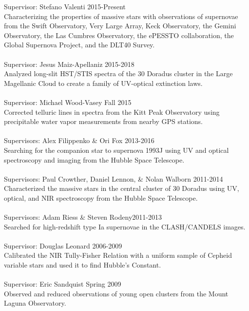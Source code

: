 \documentclass[10pt]{cv}
\begin{document}
\begin{llist}
\vspace{-0.1in}   
Supervisor: Stefano Valenti \hfill 2015-Present\\
Characterizing the properties of massive stars with observations of supernovae from the Swift Observatory, Very Large Array, Keck Observatory, the Gemini Observatory, the Las Cumbres Observatory, the ePESSTO collaboration, the Global Supernova Project, and the DLT40 Survey.\\
\\
Supervisor: Jesus Maiz-Apellaniz \hfill 2015-2018\\
Analyzed long-slit HST/STIS spectra of the 30 Doradus cluster in 
the Large Magellanic Cloud to create a family of UV-optical extinction laws. \\
\\
Supervisor: Michael Wood-Vasey \hfill Fall 2015\\
Corrected telluric lines in spectra from the Kitt Peak Observatory using
precipitable water vapor measurements from nearby GPS stations.\\
\\
Supervisors: Alex Filippenko \& Ori Fox \hfill 2013-2016\\
Searching for the companion star to supernova 1993J using UV and optical 
spectroscopy and imaging from the Hubble Space Telescope.\\
\\
Supervisors: Paul Crowther, Daniel Lennon, \& Nolan Walborn \hfill 2011-2014\\
Characterized the massive stars in the central cluster of 30 Doradus using 
UV, optical, and NIR spectroscopy from the Hubble Space Telescope.\\
\\
Supervisors: Adam Riess \& Steven Rodeny\hfill 2011-2013\\
Searched for high-redshift type Ia supernovae in the CLASH/CANDELS images.\\
\\
Supervisor: Douglas Leonard \hfill 2006-2009 \\
Calibrated the NIR Tully-Fisher Relation with a uniform sample of Cepheid variable stars and used it to find Hubble's Constant.\\
\\
Supervisor: Eric Sandquist \hfill Spring 2009\\
Observed and reduced observations of young open clusters from the Mount Laguna Observatory. \\ 

\end{llist}
\end{document}
